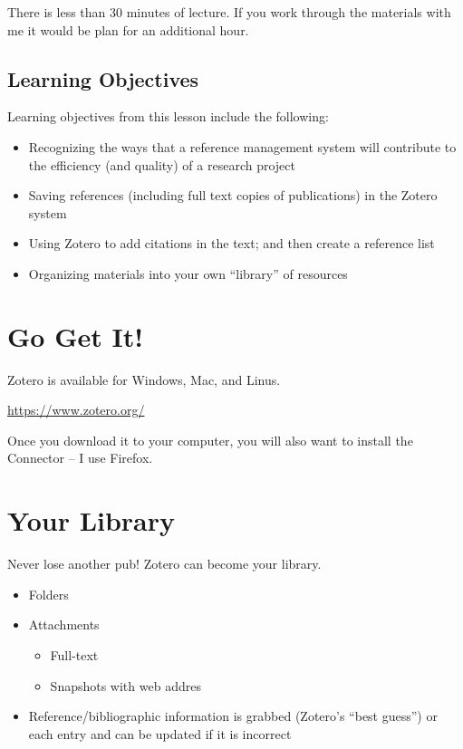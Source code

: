 \documentclass[
  english,
]{book}
\providecommand{\tightlist}{%
  \setlength{\itemsep}{0pt}\setlength{\parskip}{0pt}}
\begin{document}
There is less than 30 minutes of lecture. If you work through the materials with me it would be plan for an additional hour.

\hypertarget{learning-objectives-7}{%
\subsection{Learning Objectives}\label{learning-objectives-7}}

Learning objectives from this lesson include the following:

\begin{itemize}
\tightlist
\item
  Recognizing the ways that a reference management system will contribute to the efficiency (and quality) of a research project
\item
  Saving references (including full text copies of publications) in the Zotero system
\item
  Using Zotero to add citations in the text; and then create a reference list
\item
  Organizing materials into your own ``library'' of resources
\end{itemize}

\hypertarget{go-get-it}{%
\section{Go Get It!}\label{go-get-it}}

Zotero is available for Windows, Mac, and Linus.

\url{https://www.zotero.org/}

Once you download it to your computer, you will also want to install the Connector -- I use Firefox.

\hypertarget{your-library}{%
\section{Your Library}\label{your-library}}

Never lose another pub! Zotero can become your library.

\begin{itemize}
\tightlist
\item
  Folders
\item
  Attachments

  \begin{itemize}
  \tightlist
  \item
    Full-text
  \item
    Snapshots with web addres
  \end{itemize}
\item
  Reference/bibliographic information is grabbed (Zotero's ``best guess'') or each entry and can be updated if it is incorrect
\end{itemize}
\end{document}

